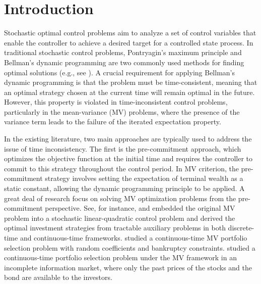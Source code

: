 \documentclass[11pt]{article}
\numberwithin{equation}{section}
\begin{document}
	
	\section{Introduction}
Stochastic optimal control problems aim to analyze a set of control variables that enable the controller to achieve a desired target for a controlled state process. In traditional stochastic control problems, Pontryagin's maximum principle and Bellman's dynamic programming are two commonly used methods for finding optimal solutions (e.g., see \citet{yong2012stochastic}). A crucial requirement for applying Bellman's dynamic programming is that the problem must be time-consistent, meaning that an optimal strategy chosen at the current time will remain optimal in the future. However, this property is violated in time-inconsistent control problems, particularly in the mean-variance (MV) problems, where the presence of the variance term leads to the failure of the iterated expectation property.

In the existing literature, two main approaches are typically used to address the issue of time inconsistency. The first is the pre-commitment approach, which optimizes the objective function at the initial time and requires the controller to commit to this strategy throughout the control period. In MV criterion, the pre-commitment strategy involves setting the expectation of terminal wealth as a static constant, allowing the dynamic programming principle to be applied. A great deal of research focus on solving MV optimization problems from the pre-commitment perspective. See, for instance, \citet{li2000optimal} and  \citet{zhou2000continuous} embedded the original MV problem into a stochastic linear-quadratic control problem and derived the optimal investment strategies from tractable auxiliary problems in both discrete-time and continuous-time frameworks. \citet{bielecki2005continuous} studied a continuous-time MV portfolio selection problem with random coefficients and bankruptcy constraints. \citet{xiong2007mean} studied a continuous-time portfolio selection problem under the MV framework in an incomplete information market, where only the past prices of the stocks and the bond are available to the investors.
\end{document}
